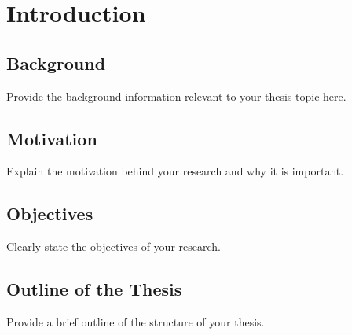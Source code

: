 \chapter{Introduction}

\section{Background}
Provide the background information relevant to your thesis topic here.

\section{Motivation}
Explain the motivation behind your research and why it is important.

\section{Objectives}
Clearly state the objectives of your research.

\section{Outline of the Thesis}
Provide a brief outline of the structure of your thesis.